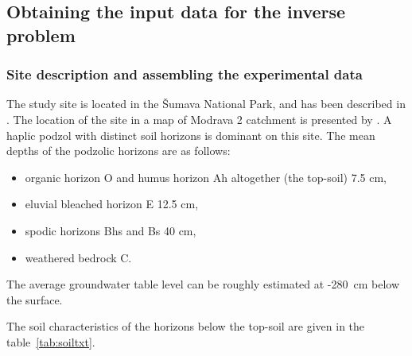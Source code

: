 \documentclass[review]{elsarticle}
\begin{document}
\subsection{Obtaining the input data for the inverse problem}
\label{assamb}


\subsubsection{Site description and assembling the experimental data}%
\label{site}
The study site is located in the \v{S}umava National Park, and has been described in \citep{Jacka1}. The location of the site in a map of Modrava 2 catchment is presented by \cite{Jacka2}.
A haplic podzol with distinct soil horizons is dominant on this site. The mean depths of the podzolic horizons are as follows:
\begin{itemize}
\item organic horizon O and humus horizon Ah altogether (the top-soil) 7.5 cm, 
\item eluvial bleached horizon E 12.5 cm, 
\item spodic horizons Bhs and Bs 40 cm,
\item weathered bedrock C.
\end{itemize}
The average groundwater table level can be roughly estimated at -280~cm below the surface. 

The soil characteristics of the horizons below the top-soil %
are given in the table~\ref{tab:soiltxt}. 

%
\end{document}
